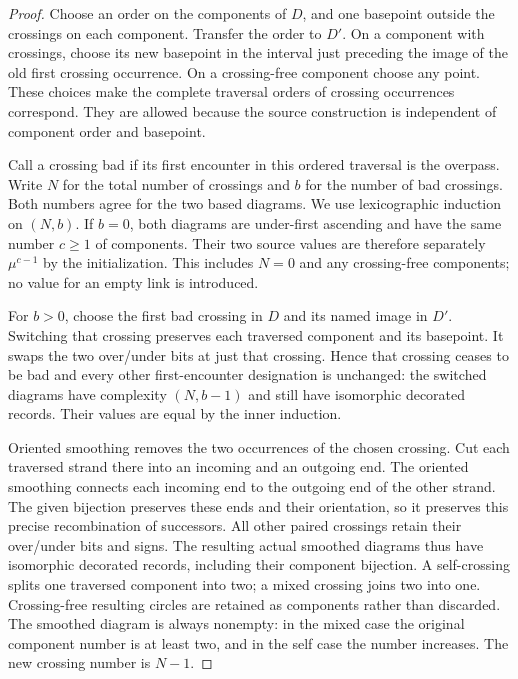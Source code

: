\begin{proof}\leanok{}
Choose an order on the components of $D$, and one basepoint outside the
crossings on each component. Transfer the order to $D'$. On a component
with crossings, choose its new basepoint in the interval just preceding
the image of the old first crossing occurrence. On a crossing-free
component choose any point. These choices make the complete traversal
orders of crossing occurrences correspond. They are allowed because the
source construction is independent of component order and basepoint.

Call a crossing bad if its first encounter in this ordered traversal is
the overpass. Write $N$ for the total number of crossings and $b$ for the
number of bad crossings. Both numbers agree for the two based diagrams.
We use lexicographic induction on $(N,b)$. If $b=0$, both diagrams are
under-first ascending and have the same number $c\geq1$ of components.
Their two source values are therefore separately $\mu^{c-1}$ by the
initialization. This includes $N=0$ and any crossing-free components;
no value for an empty link is introduced.

For $b>0$, choose the first bad crossing in $D$ and its named image in
$D'$. Switching that crossing preserves each traversed component and its
basepoint. It swaps the two over/under bits at just that crossing.
Hence that crossing ceases to be bad and every other first-encounter
designation is unchanged: the switched diagrams have complexity
$(N,b-1)$ and still have isomorphic decorated records. Their values
are equal by the inner induction.

Oriented smoothing removes the two occurrences of the chosen crossing.
Cut each traversed strand there into an incoming and an outgoing end.
The oriented smoothing connects each incoming end to the outgoing end
of the other strand. The given bijection preserves these ends and their
orientation, so it preserves this precise recombination of successors.
All other paired crossings retain their over/under bits and signs.
The resulting actual smoothed diagrams thus have isomorphic decorated
records, including their component bijection. A self-crossing splits
one traversed component into two; a mixed crossing joins two into one.
Crossing-free resulting circles are retained as components rather than
discarded. The smoothed diagram is always nonempty: in the mixed case
the original component number is at least two, and in the self case
the number increases. The new crossing number is $N-1$.


\end{proof}
